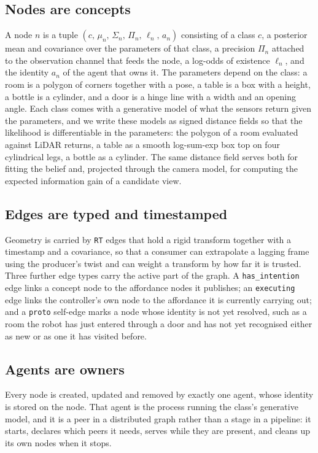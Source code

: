 \documentclass[10pt,twocolumn]{IEEEtran}
\begin{document}
\subsection{Nodes are concepts}

A node $n$ is a tuple $(c,\,\mu_n,\,\Sigma_n,\,\Pi_n,\,\ell_n,\,a_n)$ consisting of a class $c$, a
posterior mean and covariance over the parameters of that class, a precision $\Pi_n$ attached to the
observation channel that feeds the node, a log-odds of existence $\ell_n$, and the identity $a_n$ of
the agent that owns it. The parameters depend on the class: a room is a polygon of corners together
with a pose, a table is a box with a height, a bottle is a cylinder, and a door is a hinge line with a
width and an opening angle. Each class comes with a generative model of what the sensors return given
the parameters, and we write these models as signed distance fields so that the likelihood is
differentiable in the parameters: the polygon of a room evaluated against LiDAR returns, a table as a
smooth log-sum-exp box top on four cylindrical legs, a bottle as a cylinder. The same distance field
serves both for fitting the belief and, projected through the camera model, for computing the
expected information gain of a candidate view.

\subsection{Edges are typed and timestamped}

Geometry is carried by \texttt{RT} edges that hold a rigid transform together with a timestamp and a
covariance, so that a consumer can extrapolate a lagging frame using the producer's twist and can
weight a transform by how far it is trusted. Three further edge types carry the active part of the
graph. A \texttt{has\_intention} edge links a concept node to the affordance nodes it publishes; an
\texttt{executing} edge links the controller's own node to the affordance it is currently carrying
out; and a \texttt{proto} self-edge marks a node whose identity is not yet resolved, such as a room the
robot has just entered through a door and has not yet recognised either as new or as one it has
visited before.

\subsection{Agents are owners}

Every node is created, updated and removed by exactly one agent, whose identity is stored on the
node. That agent is the process running the class's generative model, and it is a peer in a
distributed graph rather than a stage in a pipeline: it starts, declares which peers it needs, serves
while they are present, and cleans up its own nodes when it stops.
\end{document}

